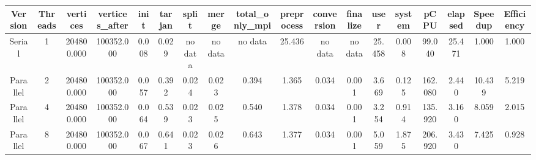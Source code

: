 \begin{tabular}{|c|c|c|c|c|c|c|c|c|c|c|c|c|c|c|c|c|c|}
\toprule
 Version &  Threads &   vertices &  vertices\_after &  init &  tarjan &   split &   merge & total\_only\_mpi &  preprocess & conversion & finalize &   user &  system &    pCPU &  elapsed &  Speedup &  Efficiency \\
\midrule
  Serial &        1 & 204800.000 &      100352.000 & 0.008 &   0.029 & no data & no data &        no data &      25.436 &    no data &  no data & 25.458 &   0.008 &  99.040 &   25.471 &    1.000 &       1.000 \\
Parallel &        2 & 204800.000 &      100352.000 & 0.057 &   0.392 &   0.024 &   0.023 &          0.394 &       1.365 &      0.034 &    0.001 &  3.669 &   0.125 & 162.080 &    2.440 &   10.439 &       5.219 \\
Parallel &        4 & 204800.000 &      100352.000 & 0.064 &   0.539 &   0.023 &   0.025 &          0.540 &       1.378 &      0.034 &    0.001 &  3.254 &   0.914 & 135.920 &    3.160 &    8.059 &       2.015 \\
Parallel &        8 & 204800.000 &      100352.000 & 0.067 &   0.641 &   0.023 &   0.026 &          0.643 &       1.377 &      0.034 &    0.001 &  5.059 &   1.875 & 206.920 &    3.430 &    7.425 &       0.928 \\
\bottomrule
\end{tabular}
